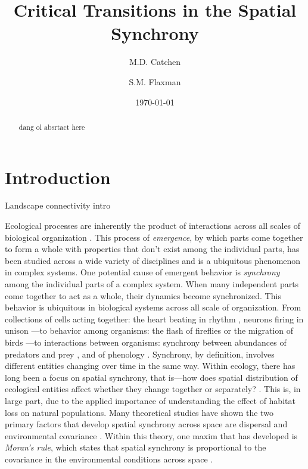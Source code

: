 \documentclass[]{article}
\title{Critical Transitions in the Spatial Synchrony}
\author[1,2]{M.D. Catchen}
\author[1]{S.M. Flaxman}
\affil[1]{\small{Department of Ecology and Evolutionary Biology, University of Colorado at Boulder}}
\affil[2]{\small{Department of Biology, McGill University}}
\date{\today}
\begin{document}
\maketitle
\begin{abstract}

dang ol absrtact here

\end{abstract}
\clearpage
\tableofcontents
\clearpage
\section{Introduction}

Landscape connectivity intro

Ecological processes are inherently the product of interactions across all scales of biological organization \cite{levin_problem_1992}. This process of \textit{emergence}, by which parts come together to form a whole with properties that don't exist among the individual parts, has been studied across a wide variety of disciplines \cite{manrubia_emergence_2004} and is a ubiquitous phenomenon in complex systems. One potential cause of emergent behavior is \textit{synchrony} among the individual parts of a complex system. When many independent parts come together to act as a whole, their dynamics become synchronized.
This behavior is ubiquitous in biological systems across all scale of organization.
From collections of cells acting together: the heart beating in rhythm \cite{womelsdorf_modulation_2007}, neurons firing in unison \cite{strogatz_sync_2003}---to behavior among organisms: the flash of fireflies \cite{otte_theories_1980} or the migration of birds \cite{spottiswoode_extrapair_2004}---to interactions between organisms: synchrony between abundances of predators and prey \cite{lv}, and of phenology \cite{van_asch_phenology_2007,burkle_future_2011}.
Synchrony, by definition, involves different entities changing over time in the same way. Within ecology, there has long been a focus on spatial synchrony, that is—how does spatial distribution of ecological entities affect whether they change together or separately? \cite{jarillo_spatial_2020, kendall_dispersal_2000, hanski_spatial_1993}.
This is, in large part, due to the applied importance of understanding the effect of habitat loss on natural populations. Many theoretical studies have shown the two primary factors that develop spatial synchrony across space are dispersal and environmental covariance \cite{ripa_analysing_2000, abbott_does_2007}.
Within this theory, one maxim that has developed is \textit{Moran's rule}, which states that spatial synchrony is proportional to the covariance in the environmental conditions across space \cite{ranta_synchrony_1995, bjornstad_spatial_1999}.
\end{document}
